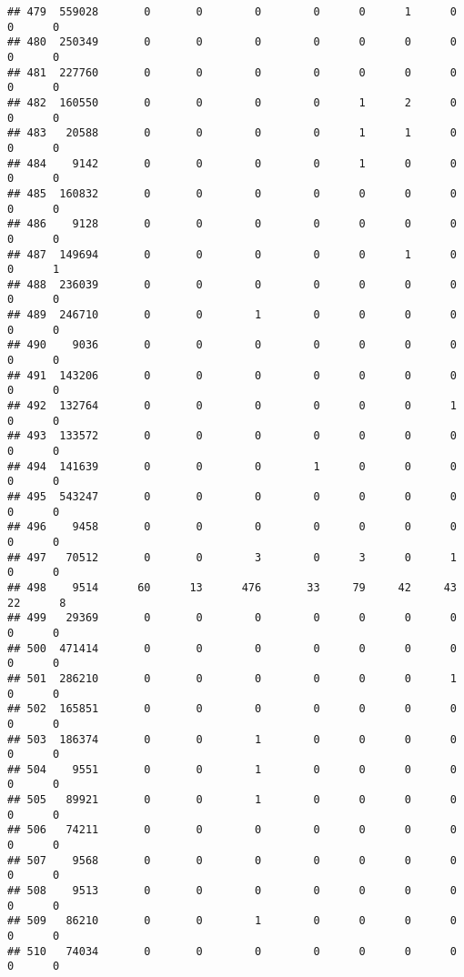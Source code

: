 \documentclass[
]{article}
\begin{document}
\begin{verbatim}
## 479  559028       0       0        0        0      0      1      0     0      0
## 480  250349       0       0        0        0      0      0      0     0      0
## 481  227760       0       0        0        0      0      0      0     0      0
## 482  160550       0       0        0        0      1      2      0     0      0
## 483   20588       0       0        0        0      1      1      0     0      0
## 484    9142       0       0        0        0      1      0      0     0      0
## 485  160832       0       0        0        0      0      0      0     0      0
## 486    9128       0       0        0        0      0      0      0     0      0
## 487  149694       0       0        0        0      0      1      0     0      1
## 488  236039       0       0        0        0      0      0      0     0      0
## 489  246710       0       0        1        0      0      0      0     0      0
## 490    9036       0       0        0        0      0      0      0     0      0
## 491  143206       0       0        0        0      0      0      0     0      0
## 492  132764       0       0        0        0      0      0      1     0      0
## 493  133572       0       0        0        0      0      0      0     0      0
## 494  141639       0       0        0        1      0      0      0     0      0
## 495  543247       0       0        0        0      0      0      0     0      0
## 496    9458       0       0        0        0      0      0      0     0      0
## 497   70512       0       0        3        0      3      0      1     0      0
## 498    9514      60      13      476       33     79     42     43    22      8
## 499   29369       0       0        0        0      0      0      0     0      0
## 500  471414       0       0        0        0      0      0      0     0      0
## 501  286210       0       0        0        0      0      0      1     0      0
## 502  165851       0       0        0        0      0      0      0     0      0
## 503  186374       0       0        1        0      0      0      0     0      0
## 504    9551       0       0        1        0      0      0      0     0      0
## 505   89921       0       0        1        0      0      0      0     0      0
## 506   74211       0       0        0        0      0      0      0     0      0
## 507    9568       0       0        0        0      0      0      0     0      0
## 508    9513       0       0        0        0      0      0      0     0      0
## 509   86210       0       0        1        0      0      0      0     0      0
## 510   74034       0       0        0        0      0      0      0     0      0

\end{verbatim}
\end{document}
